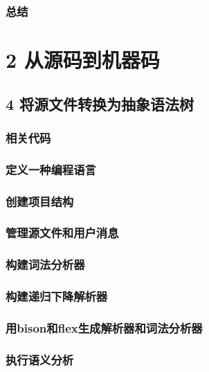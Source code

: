 \documentclass[11pt,a4paper,UTF8]{ctexart}
\begin{document}
		\subsubsection*{ 总结}
		
		
    \pagecolor{mygray}
    \color{white}
	\section*{ 2 从源码到机器码}
	\color{black}
	\pagecolor{white}
	
	\subsection{4 将源文件转换为抽象语法树}
		\subsubsection{相关代码}
		\subsubsection{定义一种编程语言}
		\subsubsection{创建项目结构}
		\subsubsection{管理源文件和用户消息}
		\subsubsection{构建词法分析器}
		\subsubsection{构建递归下降解析器}
		\subsubsection{用bison和flex生成解析器和词法分析器}
		\subsubsection{执行语义分析}
\end{document}
